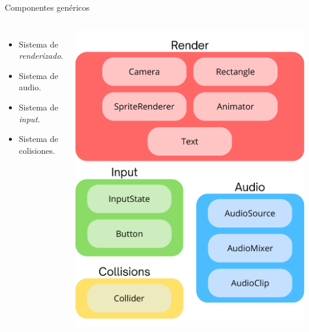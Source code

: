 \documentclass[aspectratio=169]{beamer}
\begin{document}
\begin{frame}{Componentes genéricos}
	\begin{columns}
		\begin{itemize}
			\item Sistema de \textit{renderizado}.
			\item Sistema de audio.
			\item Sistema de \textit{input}.
			\item Sistema de colisiones.
		\end{itemize}
			\includegraphics[height=0.85\textheight]{imgs/motor/ComponentesGenericos.pdf}
	\end{columns}
\end{frame}
\end{document}

